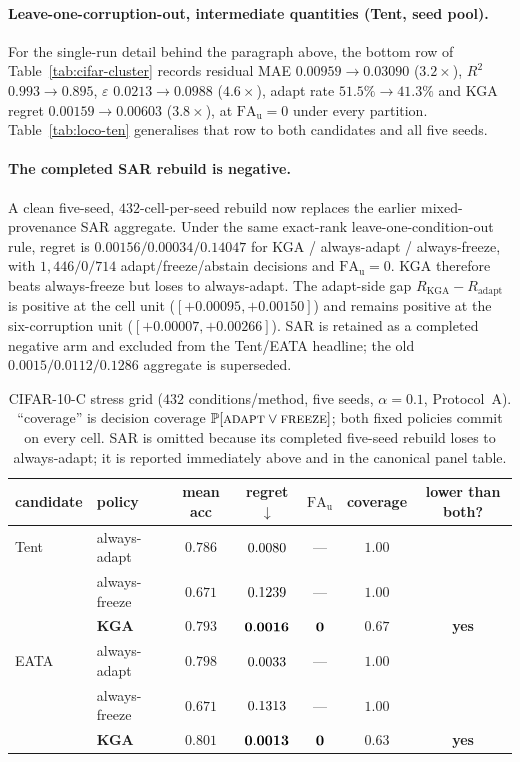 \paragraph{Leave-one-corruption-out, intermediate quantities (Tent, seed pool).} For the single-run detail behind the paragraph above, the bottom row of Table~\ref{tab:cifar-cluster} records residual MAE $0.00959\to0.03090$ ($3.2\times$), $R^2$ $0.993\to0.895$, $\varepsilon$ $0.0213\to0.0988$ ($4.6\times$), adapt rate $51.5\%\to41.3\%$ and \textsc{KGA} regret $0.00159\to0.00603$ ($3.8\times$), at $\mathrm{FA}_{\mathrm u}=0$ under every partition. Table~\ref{tab:loco-ten} generalises that row to both candidates and all five seeds.

\paragraph{The completed SAR rebuild is negative.} A clean five-seed, $432$-cell-per-seed rebuild now
replaces the earlier mixed-provenance SAR aggregate. Under the same exact-rank leave-one-condition-out
rule, regret is $0.00156/0.00034/0.14047$ for KGA / always-adapt / always-freeze, with
$1{,}446/0/714$ adapt/freeze/abstain decisions and $\mathrm{FA}_{\mathrm u}=0$. KGA therefore
beats always-freeze but loses to always-adapt. The adapt-side gap $R_{\mathrm{KGA}}-R_{\mathrm{adapt}}$
is positive at the cell unit ($[+0.00095,+0.00150]$) and remains positive at the six-corruption
unit ($[+0.00007,+0.00266]$). SAR is retained as a completed negative arm and excluded from the
Tent/EATA headline; the old $0.0015/0.0112/0.1286$ aggregate is superseded.

\begin{table}[t]\centering\small
\begin{tabular}{llccccc}
\toprule
candidate & policy & mean acc & regret$\downarrow$ & $\mathrm{FA}_{\mathrm u}$ & coverage & lower than both? \\
\midrule
Tent & always-adapt  & $0.786$ & $\CIFARtentAdapt$ & --- & $1.00$ & \\
     & always-freeze & $0.671$ & $\CIFARtentFreeze$ & --- & $1.00$ & \\
     & \textbf{\textsc{KGA}} & $\mathbf{0.793}$ & $\mathbf{\CIFARtentKga}$ & $\mathbf{\CIFARtentFA}$ & $0.67$ & \textbf{yes} \\
\midrule
EATA & always-adapt  & $0.798$ & $\CIFAReataAdapt$ & --- & $1.00$ & \\
     & always-freeze & $0.671$ & $\CIFAReataFreeze$ & --- & $1.00$ & \\
     & \textbf{\textsc{KGA}} & $\mathbf{0.801}$ & $\mathbf{\CIFAReataKga}$ & $\mathbf{\CIFAReataFA}$ & $0.63$ & \textbf{yes} \\
\bottomrule
\end{tabular}
\caption{CIFAR-10-C stress grid ($432$ conditions/method, five seeds, $\alpha{=}0.1$,
Protocol~A). ``coverage'' is decision coverage $\Pr[\textsc{adapt}\lor\textsc{freeze}]$; both fixed
policies commit on every cell. SAR is omitted because its completed five-seed rebuild loses to
always-adapt; it is reported immediately above and in the canonical panel table.}
\label{tab:decisive}
\end{table}

